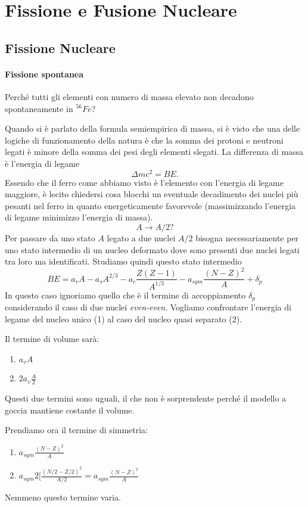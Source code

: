 
\section{Fissione e Fusione Nucleare}

\subsection{Fissione Nucleare}
\paragraph{Fissione spontanea}
Perché tutti gli elementi con numero di massa elevato non decadono spontaneamente in $^{56}Fe$?

Quando si è parlato della formula semiempirica di massa, si è visto che una delle logiche di funzionamento della natura è che la somma dei protoni e neutroni legati è minore della somma dei pesi degli elementi slegati. 
La differenza di massa è l'energia di legame
\[
\Delta mc^2=BE.
\]
Essendo che il ferro come abbiamo visto è l'elemento con l'energia di legame maggiore, è lecito chiedersi cosa blocchi un eventuale decadimento dei nuclei più pesanti nel ferro in quanto energeticamente favorevole (massimizzando l'energia di legame minimizzo l'energia di massa).
\[
A\to A/2?
\]
Per passare da uno stato $A$ legato a due nuclei $A/2$ bisogna necessariamente per uno stato intermedio di un nucleo deformato dove sono presenti due nuclei legati tra loro ma identificati.
Studiamo quindi questo stato intermedio 
\begin{equation}
BE= a_v A-a_s A^{2/3}-a_c \frac{Z(Z-1)}{A^{1/3}}-a_{sym}\frac{(N-Z)^2}{A}+\delta_p
\end{equation}
In questo caso ignoriamo quello che è il termine di accoppiamento $\delta_p$ considerando il caso di due nuclei \emph{even-even}.
Vogliamo confrontare l'energia di legame del nucleo unico (1) al caso del nucleo quasi separato (2).

Il termine di volume sarà:
\begin{enumerate}
\item $a_v A$
\item $2a_v \frac{A}{2}$
\end{enumerate}
Questi due termini sono uguali, il che non è sorprendente perché il modello a goccia mantiene costante il volume.

Prendiamo ora il termine di simmetria:
\begin{enumerate}
\item $a_{sym}\frac{(N-Z)^2}{A}$
\item $a_{sym} 2\biggl[\frac{(N/2 -Z/2)^2}{A/2}=a_{sym}\frac{(N-Z)^2}{A}$
\end{enumerate}
Nemmeno questo termine varia.

